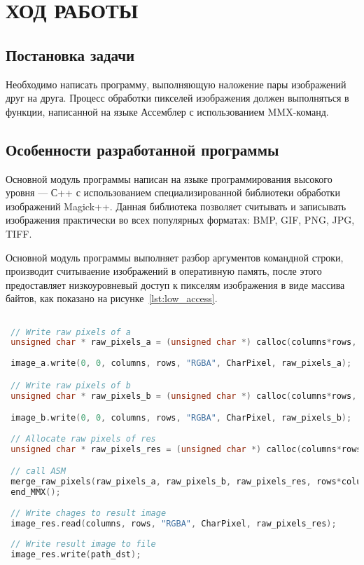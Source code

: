 \section{ХОД РАБОТЫ}

\subsection{Постановка задачи}

Необходимо написать программу, выполняющую наложение пары изображений друг на друга.
Процесс обработки пикселей изображения должен выполняться в функции,
написанной на языке Ассемблер с использованием MMX-команд.

\subsection{Особенности разработанной программы}

Основной модуль программы написан на языке программирования высокого уровня --- С++ с
использованием специализированной библиотеки обработки изображений Magick++. 
Данная библиотека позволяет считывать и записывать изображения практически 
во всех популярных форматах: BMP, GIF, PNG, JPG, TIFF.

Основной модуль программы выполняет разбор аргументов командной строки,
производит считываение изображений в оперативную память, после этого
предоставляет низкоуровневый доступ к пикселям изображения в виде 
массива байтов, как показано на рисунке~\ref{lst:low_access}.

\begin{lstlisting}[caption=Предоставление низкоуровневого доступа к изображению,
label=lst:low_access,language={C++},basicstyle=\scriptsize\ttfamily]

 // Write raw pixels of a
 unsigned char * raw_pixels_a = (unsigned char *) calloc(columns*rows, SIZE_RGBA);
   
 image_a.write(0, 0, columns, rows, "RGBA", CharPixel, raw_pixels_a);

 // Write raw pixels of b
 unsigned char * raw_pixels_b = (unsigned char *) calloc(columns*rows, SIZE_RGBA);

 image_b.write(0, 0, columns, rows, "RGBA", CharPixel, raw_pixels_b);
   
 // Allocate raw pixels of res
 unsigned char * raw_pixels_res = (unsigned char *) calloc(columns*rows, SIZE_RGBA);

 // call ASM
 merge_raw_pixels(raw_pixels_a, raw_pixels_b, raw_pixels_res, rows*columns);
 end_MMX();
   
 // Write chages to result image
 image_res.read(columns, rows, "RGBA", CharPixel, raw_pixels_res);
   
 // Write result image to file 
 image_res.write(path_dst);
\end{lstlisting}

